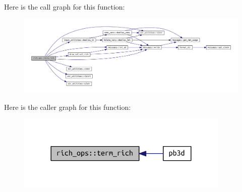 Here is the call graph for this function\+:
\nopagebreak
\begin{figure}[H]
\begin{center}
\leavevmode
\includegraphics[width=350pt]{namespacerich__ops_a3cf72a3ed0806ac9ddff262a00b2e33d_cgraph}
\end{center}
\end{figure}
Here is the caller graph for this function\+:
\nopagebreak
\begin{figure}[H]
\begin{center}
\leavevmode
\includegraphics[width=288pt]{namespacerich__ops_a3cf72a3ed0806ac9ddff262a00b2e33d_icgraph}
\end{center}
\end{figure}
